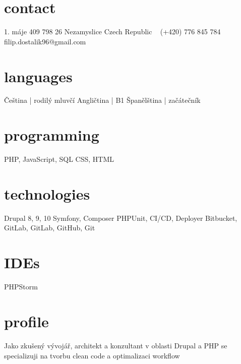 \documentclass[]{friggeri-cv} %
\begin{document}


\begin{aside} %
\section{contact}
1. máje 409
798 26 Nezamyslice
Czech Republic
~
(+420) 776 845 784
~
filip.dostalik96@gmail.com
\section{languages}
Čeština | rodilý mluvčí
Angličtina | B1
Španělština | začátečník
\section{programming}
PHP, JavaScript, SQL
CSS, HTML
\section{technologies}
Drupal 8, 9, 10
Symfony, Composer
PHPUnit, CI/CD, Deployer
Bitbucket, GitLab,
GitLab, GitHub, Git
\section{IDEs}
PHPStorm
\end{aside}

\section{profile}
Jako zkušený vývojář, architekt a konzultant v oblasti Drupal a PHP se specializuji
na tvorbu clean code a optimalizaci workflow

\end{document}
